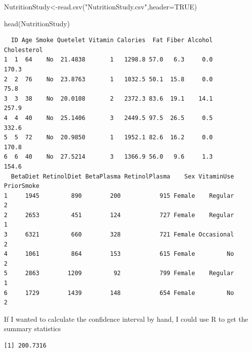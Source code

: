 \documentclass[
  letterpaper,
  DIV=11,
  numbers=noendperiod]{scrartcl}
\newenvironment{Shaded}{\begin{snugshade}}{\end{snugshade}}
\newcommand{\AttributeTok}[1]{\textcolor[rgb]{0.40,0.45,0.13}{#1}}
\newcommand{\ConstantTok}[1]{\textcolor[rgb]{0.56,0.35,0.01}{#1}}
\newcommand{\FunctionTok}[1]{\textcolor[rgb]{0.28,0.35,0.67}{#1}}
\newcommand{\NormalTok}[1]{\textcolor[rgb]{0.00,0.23,0.31}{#1}}
\newcommand{\OtherTok}[1]{\textcolor[rgb]{0.00,0.23,0.31}{#1}}
\newcommand{\SpecialCharTok}[1]{\textcolor[rgb]{0.37,0.37,0.37}{#1}}
\newcommand{\StringTok}[1]{\textcolor[rgb]{0.13,0.47,0.30}{#1}}
\begin{document}
\begin{Shaded}
\begin{Highlighting}[]
\NormalTok{NutritionStudy}\OtherTok{\textless{}{-}}\FunctionTok{read.csv}\NormalTok{(}\StringTok{"NutritionStudy.csv"}\NormalTok{,}\AttributeTok{header=}\ConstantTok{TRUE}\NormalTok{)}

\FunctionTok{head}\NormalTok{(NutritionStudy)}
\end{Highlighting}
\end{Shaded}

\begin{verbatim}
  ID Age Smoke Quetelet Vitamin Calories  Fat Fiber Alcohol Cholesterol
1  1  64    No  21.4838       1   1298.8 57.0   6.3     0.0       170.3
2  2  76    No  23.8763       1   1032.5 50.1  15.8     0.0        75.8
3  3  38    No  20.0108       2   2372.3 83.6  19.1    14.1       257.9
4  4  40    No  25.1406       3   2449.5 97.5  26.5     0.5       332.6
5  5  72    No  20.9850       1   1952.1 82.6  16.2     0.0       170.8
6  6  40    No  27.5214       3   1366.9 56.0   9.6     1.3       154.6
  BetaDiet RetinolDiet BetaPlasma RetinolPlasma    Sex VitaminUse PriorSmoke
1     1945         890        200           915 Female    Regular          2
2     2653         451        124           727 Female    Regular          1
3     6321         660        328           721 Female Occasional          2
4     1061         864        153           615 Female         No          2
5     2863        1209         92           799 Female    Regular          1
6     1729        1439        148           654 Female         No          2
\end{verbatim}

If I wanted to calculate the confidence interval by hand, I could use R
to get the summary statistics

\begin{Shaded}
\end{Shaded}

\begin{verbatim}
[1] 200.7316
\end{verbatim}

\begin{Shaded}
\end{Shaded}
\end{document}

